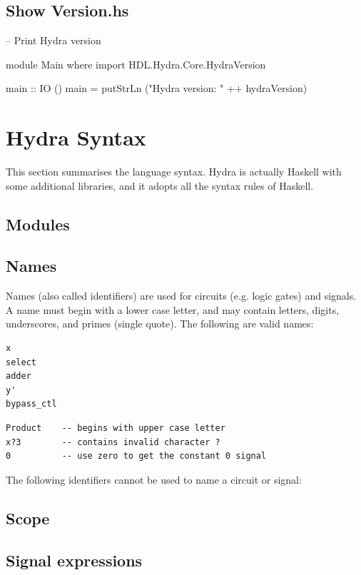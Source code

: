 \documentclass[]{svmono}
\begin{document}
\subsection*{Show Version.hs}
\label{sec:org20050f6}

-- Print Hydra version

module Main where
import HDL.Hydra.Core.HydraVersion

main :: IO ()
main = putStrLn ("Hydra version: " ++ hydraVersion)
\section*{Hydra Syntax}
\label{sec:org1f6a184}

This section summarises the language syntax.  Hydra is actually
Haskell with some additional libraries, and it adopts all the
syntax rules of Haskell.
\subsection*{Modules}
\label{sec:orge53883d}

\subsection*{Names}
\label{sec:org837526c}

Names (also called identifiers) are used for circuits (e.g. logic
gates) and signals.  A name must begin with a lower case letter,
and may contain letters, digits, underscores, and primes (single
quote).  The following are valid names:

\begin{verbatim}
x
select
adder
y'
bypass_ctl
\end{verbatim}

\begin{verbatim}
Product    -- begins with upper case letter
x?3        -- contains invalid character ?
0          -- use zero to get the constant 0 signal
\end{verbatim}

The following identifiers cannot be used to name a circuit or
signal:
\subsection*{Scope}
\label{sec:org0fd6a19}

\subsection*{Signal expressions}
\label{sec:org40bdabb}
\end{document}
